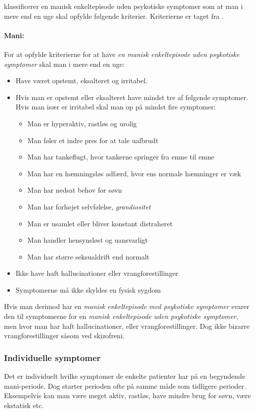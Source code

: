 \citet{misc:netpsykmani} klassificerer en manisk enkeltepisode uden psykotiske symptomer som at man i mere end en uge skal opfylde følgende kriterier.
Kriterierne er taget fra \citet{misc:netpsykmani}.
\begin{mdframed}
\paragraph{Mani:}
For at opfylde kriterierne for at have \textit{en manisk enkeltepisode uden psykotiske symptomer} skal man i mere end en uge:
\begin{itemize}
	\item Have været opstemt, eksalteret og irritabel.
	\item Hvis man er opstemt eller eksalteret have mindst tre af følgende symptomer. Hvis man især er irritabel skal man op på mindst fire symptomer:
	\begin{itemize}
		\item Man er hyperaktiv, rastløs og urolig
		\item Man føler et indre pres for at tale uafbrudt
		\item Man har tankeflugt, hvor tankerne springer fra emne til emne
		\item Man har en hæmningsløs adfærd, hvor ens normale hæmninger er væk
		\item Man har nedsat behov for søvn
		\item Man har forhøjet selvfølelse, \textit{grandiositet}
		\item Man er usamlet eller bliver konstant distraheret
		\item Man handler hensynsløst og uansvarligt
		\item Man har større seksualdrift end normalt
	\end{itemize}
	\item Ikke have haft hallucinationer eller vrangforestillinger
	\item Symptomerne må ikke skyldes en fysisk sygdom
\end{itemize}
\end{mdframed}
Hvis man derimod har en \textit{manisk enkeltepisode med psykotiske symptomer} svarer den til symptomerne for en \textit{manisk enkeltepisode uden psykotiske symptomer}, men hvor man har haft hallucinationer, eller vrangforestillinger. Dog ikke bizarre vrangforestillinger såsom ved skizofreni.

\subsubsection{Individuelle symptomer}
Det er individuelt hvilke symptomer de enkelte patienter har på en begyndende mani-periode.
Dog starter perioden ofte på samme måde som tidligere perioder.
Eksempelvis kan man være meget aktiv, rastløs, have mindre brug for søvn, være ekstatisk etc.

